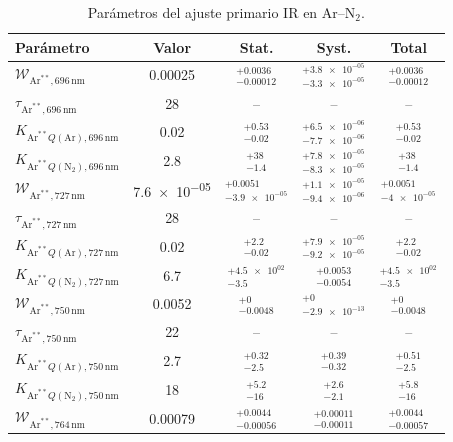 \begin{table}[htbp]
\centering
\caption{Parámetros del ajuste primario IR en Ar--N$_2$.}
\label{tab:ArN2_IR_primary_stat_syst}
\begin{tabular}{lcccc}
\toprule
Parámetro & Valor & Stat. & Syst. & Total \\
\midrule
$\mathcal{W}_{\mathrm{Ar}^{**},696\,\mathrm{nm}}$ & \num{0.00025} & $^{+\num{0.0036}}_{-\num{0.00012}}$ & $^{+\num{3.8e-05}}_{-\num{3.3e-05}}$ & $^{+\num{0.0036}}_{-\num{0.00012}}$ \\
$\tau_{\mathrm{Ar}^{**},696\,\mathrm{nm}}$ & \num{28} & -- & -- & -- \\
$K_{\mathrm{Ar}^{**}Q(\mathrm{Ar}),696\,\mathrm{nm}}$ & \num{0.02} & $^{+\num{0.53}}_{-\num{0.02}}$ & $^{+\num{6.5e-06}}_{-\num{7.7e-06}}$ & $^{+\num{0.53}}_{-\num{0.02}}$ \\
$K_{\mathrm{Ar}^{**}Q(\mathrm{N}_2),696\,\mathrm{nm}}$ & \num{2.8} & $^{+\num{38}}_{-\num{1.4}}$ & $^{+\num{7.8e-05}}_{-\num{8.3e-05}}$ & $^{+\num{38}}_{-\num{1.4}}$ \\
$\mathcal{W}_{\mathrm{Ar}^{**},727\,\mathrm{nm}}$ & \num{7.6e-05} & $^{+\num{0.0051}}_{-\num{3.9e-05}}$ & $^{+\num{1.1e-05}}_{-\num{9.4e-06}}$ & $^{+\num{0.0051}}_{-\num{4e-05}}$ \\
$\tau_{\mathrm{Ar}^{**},727\,\mathrm{nm}}$ & \num{28} & -- & -- & -- \\
$K_{\mathrm{Ar}^{**}Q(\mathrm{Ar}),727\,\mathrm{nm}}$ & \num{0.02} & $^{+\num{2.2}}_{-\num{0.02}}$ & $^{+\num{7.9e-05}}_{-\num{9.2e-05}}$ & $^{+\num{2.2}}_{-\num{0.02}}$ \\
$K_{\mathrm{Ar}^{**}Q(\mathrm{N}_2),727\,\mathrm{nm}}$ & \num{6.7} & $^{+\num{4.5e+02}}_{-\num{3.5}}$ & $^{+\num{0.0053}}_{-\num{0.0054}}$ & $^{+\num{4.5e+02}}_{-\num{3.5}}$ \\
$\mathcal{W}_{\mathrm{Ar}^{**},750\,\mathrm{nm}}$ & \num{0.0052} & $^{+\num{0}}_{-\num{0.0048}}$ & $^{+\num{0}}_{-\num{2.9e-13}}$ & $^{+\num{0}}_{-\num{0.0048}}$ \\
$\tau_{\mathrm{Ar}^{**},750\,\mathrm{nm}}$ & \num{22} & -- & -- & -- \\
$K_{\mathrm{Ar}^{**}Q(\mathrm{Ar}),750\,\mathrm{nm}}$ & \num{2.7} & $^{+\num{0.32}}_{-\num{2.5}}$ & $^{+\num{0.39}}_{-\num{0.32}}$ & $^{+\num{0.51}}_{-\num{2.5}}$ \\
$K_{\mathrm{Ar}^{**}Q(\mathrm{N}_2),750\,\mathrm{nm}}$ & \num{18} & $^{+\num{5.2}}_{-\num{16}}$ & $^{+\num{2.6}}_{-\num{2.1}}$ & $^{+\num{5.8}}_{-\num{16}}$ \\
$\mathcal{W}_{\mathrm{Ar}^{**},764\,\mathrm{nm}}$ & \num{0.00079} & $^{+\num{0.0044}}_{-\num{0.00056}}$ & $^{+\num{0.00011}}_{-\num{0.00011}}$ & $^{+\num{0.0044}}_{-\num{0.00057}}$ \\

\end{tabular}
\end{table}

